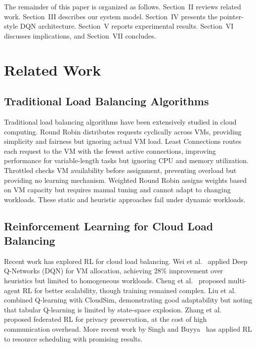 \documentclass[conference]{IEEEtran}
\begin{document}
The remainder of this paper is organized as follows. Section~II reviews related work. Section~III describes our system model. Section~IV presents the pointer-style DQN architecture. Section~V reports experimental results. Section~VI discusses implications, and Section~VII concludes.

\section{Related Work}

\subsection{Traditional Load Balancing Algorithms}

Traditional load balancing algorithms have been extensively studied in cloud computing. Round Robin distributes requests cyclically across VMs, providing simplicity and fairness but ignoring actual VM load. Least Connections routes each request to the VM with the fewest active connections, improving performance for variable-length tasks but ignoring CPU and memory utilization. Throttled checks VM availability before assignment, preventing overload but providing no learning mechanism. Weighted Round Robin assigns weights based on VM capacity but requires manual tuning and cannot adapt to changing workloads. These static and heuristic approaches fail under dynamic workloads.

\subsection{Reinforcement Learning for Cloud Load Balancing}

Recent work has explored RL for cloud load balancing. Wei et al.~\cite{wei2020} applied Deep Q-Networks (DQN) for VM allocation, achieving 28\% improvement over heuristics but limited to homogeneous workloads. Cheng et al.~\cite{cheng2021} proposed multi-agent RL for better scalability, though training remained complex. Liu et al.~\cite{liu2022} combined Q-learning with CloudSim, demonstrating good adaptability but noting that tabular Q-learning is limited by state-space explosion. Zhang et al.~\cite{zhang2023} proposed federated RL for privacy preservation, at the cost of high communication overhead. More recent work by Singh and Buyya~\cite{singh2023} has applied RL to resource scheduling with promising results.
\end{document}
